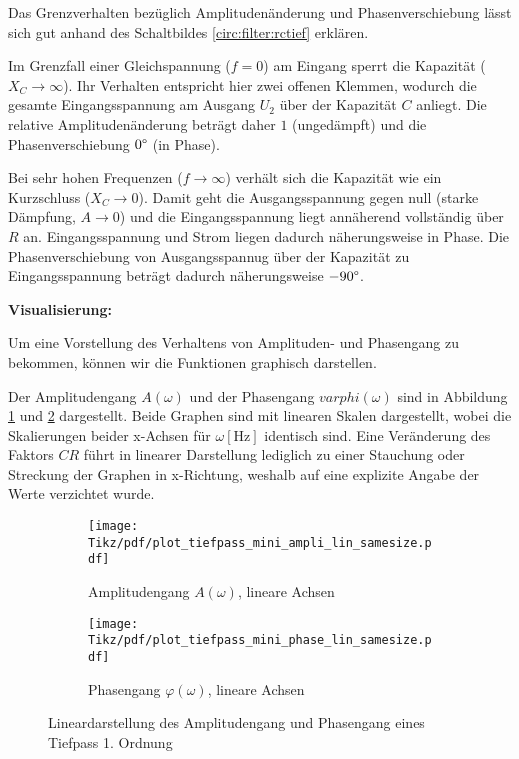 \begin{frame}[t]
{    Das Grenzverhalten bezüglich Amplitudenänderung und Phasenverschiebung lässt sich gut anhand des 
    Schaltbildes \ref{circ:filter:rctief} erklären. %
    
    Im Grenzfall einer Gleichspannung ($f=0$) am Eingang sperrt die Kapazität ($X_C \rightarrow \infty$). 
    Ihr Verhalten entspricht hier zwei offenen Klemmen, wodurch die gesamte Eingangsspannung am Ausgang $U_2$ über der Kapazität $C$ anliegt. 
    Die relative Amplitudenänderung beträgt daher $1$ (ungedämpft) und die Phasenverschiebung $0\degree$ (in Phase). 

    Bei sehr hohen Frequenzen ($f\rightarrow \infty$) verhält sich die Kapazität wie ein Kurzschluss ($X_C \rightarrow 0$).
    Damit geht die Ausgangsspannung gegen null (starke Dämpfung, $A\rightarrow 0$) und die Eingangsspannung liegt annäherend vollständig über $R$ an.
    Eingangsspannung und Strom liegen dadurch näherungsweise in Phase. Die Phasenverschiebung von Ausgangsspannug über der Kapazität
    zu Eingangsspannung beträgt dadurch näherungsweise $-90\degree$.
    
    \textbf{Visualisierung:}

    Um eine Vorstellung des Verhaltens von Amplituden- und Phasengang zu bekommen, können wir die Funktionen graphisch darstellen. 

    Der Amplitudengang $A(\omega)$ und der Phasengang $varphi(\omega)$ sind in 
    Abbildung \ref{plot:tiefpass:ampli:mini:lin} und \ref{plot:tiefpass:phase:mini:lin} dargestellt.
    Beide Graphen sind mit linearen Skalen dargestellt, wobei die Skalierungen beider x-Achsen für $\omega \left[\mathrm{Hz}\right]$ identisch sind. 
    Eine Veränderung des Faktors $CR$ führt in linearer Darstellung lediglich zu einer Stauchung oder Streckung der Graphen in x-Richtung, 
    weshalb auf eine explizite Angabe der Werte verzichtet wurde. 

    \begin{figure}[h]\centering
        \begin{subfigure}{0.45\textwidth}\centering
            \texttt{[image: Tikz/pdf/plot\_tiefpass\_mini\_ampli\_lin\_samesize.pdf]}
            \caption{Amplitudengang $A(\omega)$, lineare Achsen}
            \label{plot:tiefpass:ampli:mini:lin}
        \end{subfigure}
        \begin{subfigure}{0.45\textwidth}\centering
        \texttt{[image: Tikz/pdf/plot\_tiefpass\_mini\_phase\_lin\_samesize.pdf]}
            \caption{Phasengang $\varphi(\omega)$, lineare Achsen}
            \label{plot:tiefpass:phase:mini:lin}
        \end{subfigure}
        \caption{Lineardarstellung des Amplitudengang und Phasengang eines Tiefpass 1. Ordnung}
        \label{plot:tiefpass:mini:lin}
    \end{figure}

}
\end{frame}
